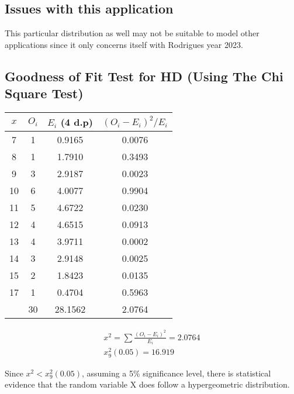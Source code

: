 \documentclass{article}
\begin{document}
\subsection{Issues with this application}
This particular distribution as well may not be suitable to model
other applications since it only concerns itself with Rodrigues 
year 2023.

\subsection{Goodness of Fit Test for HD (Using The Chi Square Test)}
\begin{center}
  \begin{tabular}{|c|c|c|c|}
  \hline
    $ x $ & $ O_i $ & $ E_i $ (4 d.p) & $(O_i - E_i)^2 / E_i$ \\
    \hline
    \hline
    7  & 1 & 0.9165 & 0.0076 \\
    8  & 1 & 1.7910 & 0.3493 \\
    9  & 3 & 2.9187 & 0.0023 \\
    10 & 6 & 4.0077 & 0.9904 \\
    11 & 5 & 4.6722 & 0.0230 \\
    12 & 4 & 4.6515 & 0.0913 \\
    13 & 4 & 3.9711 & 0.0002 \\
    14 & 3 & 2.9148 & 0.0025 \\
    15 & 2 & 1.8423 & 0.0135 \\
    17 & 1 & 0.4704 & 0.5963 \\
    \hline
    \hline
       & 30& 28.1562& 2.0764 \\
    \hline
  \end{tabular}
\end{center}

\begin{gather*}
  x^2 = \sum \frac{(O_i - E_i)^2}{E_i} = 2.0764 \\[5pt]
  x^2_9(0.05) = 16.919
\end{gather*}

Since $ x^2 < x^2_9(0.05) $,
assuming a 5\% significance level,
there is statistical evidence that
the random variable X does 
follow a hypergeometric distribution.
\end{document}
